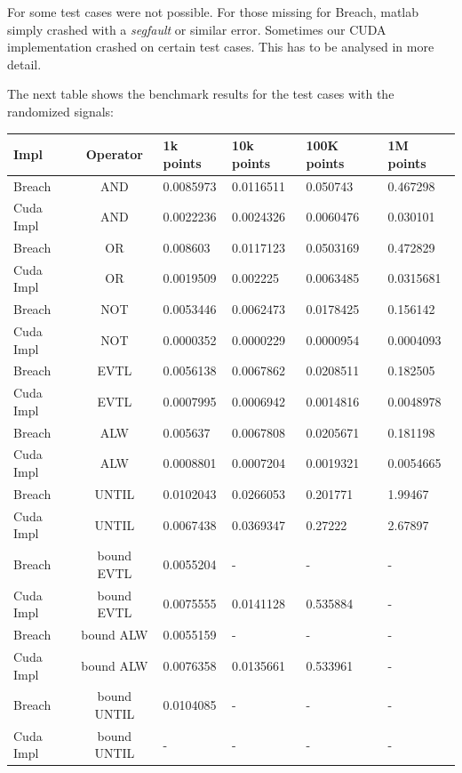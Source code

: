 \documentclass[a4paper,10pt]{article}
\begin{document}
For some test cases were not possible. For those missing for Breach, matlab simply crashed with a
{\it segfault} or similar error. Sometimes our CUDA implementation crashed on certain test cases. 
This has to be analysed in more detail.

The next table shows the benchmark results for the test cases with the randomized signals:

\begin{center}
	\begin{tabular}{| l | c || l | l | l | l |}
	    \hline
	    Impl & Operator & 1k points & 10k points & 100K points & 1M points \\
	    \hline \hline
	    Breach & AND & 0.0085973 & 0.0116511 & 0.050743 & 0.467298 \\
	    Cuda Impl & AND & 0.0022236 & 0.0024326 & 0.0060476 & 0.030101  \\
	    \hline \hline
	    Breach & OR & 0.008603 & 0.0117123 & 0.0503169 & 0.472829  \\
	    Cuda Impl & OR & 0.0019509 & 0.002225 & 0.0063485 & 0.0315681 \\
	    \hline \hline   
	    Breach & NOT & 0.0053446 & 0.0062473 & 0.0178425 & 0.156142 \\
	    Cuda Impl & NOT & 0.0000352 & 0.0000229 & 0.0000954 & 0.0004093 \\
	    \hline \hline   
        Breach & EVTL & 0.0056138 & 0.0067862 & 0.0208511 & 0.182505  \\
        Cuda Impl & EVTL & 0.0007995 & 0.0006942 & 0.0014816 & 0.0048978  \\
	    \hline \hline   
        Breach & ALW  & 0.005637 & 0.0067808 & 0.0205671 & 0.181198 \\
        Cuda Impl & ALW & 0.0008801 & 0.0007204 & 0.0019321 & 0.0054665  \\
	    \hline \hline   
        Breach & UNTIL & 0.0102043 & 0.0266053 & 0.201771 & 1.99467  \\
        Cuda Impl & UNTIL & 0.0067438 & 0.0369347 & 0.27222 & 2.67897  \\        
	    \hline \hline   
        Breach & bound EVTL & 0.0055204 & - & - & -  \\
        Cuda Impl & bound EVTL  & 0.0075555 & 0.0141128 & 0.535884 & - \\        
	    \hline \hline   
        Breach & bound ALW  & 0.0055159 & - & - & - \\
        Cuda Impl & bound ALW  & 0.0076358 & 0.0135661 & 0.533961 & - \\        
	    \hline \hline   
        Breach & bound UNTIL & 0.0104085 & - & - & - \\
        Cuda Impl & bound UNTIL & - & - & - & - \\        
	    \hline
	\end{tabular}
	\label{tab: bechmark results signal type2}
\end{center}
\end{document}
